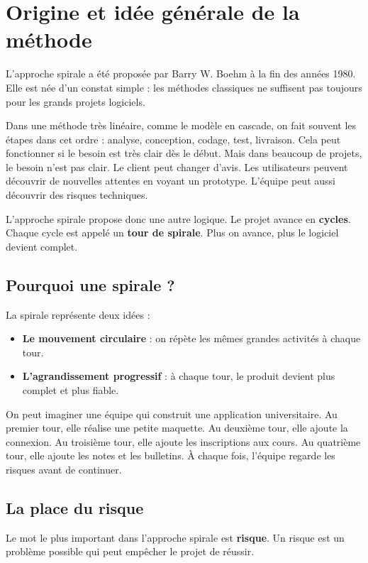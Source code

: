 \documentclass[12pt,a4paper]{article}
\newcommand{\important}[1]{\textbf{#1}}
\newcommand{\risque}[1]{\textbf{#1}}
\begin{document}
\section{Origine et idée générale de la méthode}

L'approche spirale a été proposée par Barry W. Boehm à la fin des années 1980. Elle est née d'un constat simple : les méthodes classiques ne suffisent pas toujours pour les grands projets logiciels.

Dans une méthode très linéaire, comme le modèle en cascade, on fait souvent les étapes dans cet ordre : analyse, conception, codage, test, livraison. Cela peut fonctionner si le besoin est très clair dès le début. Mais dans beaucoup de projets, le besoin n'est pas clair. Le client peut changer d'avis. Les utilisateurs peuvent découvrir de nouvelles attentes en voyant un prototype. L'équipe peut aussi découvrir des risques techniques.

L'approche spirale propose donc une autre logique. Le projet avance en \important{cycles}. Chaque cycle est appelé un \important{tour de spirale}. Plus on avance, plus le logiciel devient complet.

\subsection{Pourquoi une spirale ?}

La spirale représente deux idées :

\begin{itemize}
    \item \textbf{Le mouvement circulaire} : on répète les mêmes grandes activités à chaque tour.
    \item \textbf{L'agrandissement progressif} : à chaque tour, le produit devient plus complet et plus fiable.
\end{itemize}

On peut imaginer une équipe qui construit une application universitaire. Au premier tour, elle réalise une petite maquette. Au deuxième tour, elle ajoute la connexion. Au troisième tour, elle ajoute les inscriptions aux cours. Au quatrième tour, elle ajoute les notes et les bulletins. À chaque fois, l'équipe regarde les risques avant de continuer.

\subsection{La place du risque}

Le mot le plus important dans l'approche spirale est \risque{risque}. Un risque est un problème possible qui peut empêcher le projet de réussir.
\end{document}
